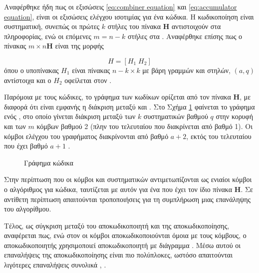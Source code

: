 Αναφέρθηκε ήδη πως οι εξισώσεις \ref{eq:combiner equation} και \ref{eq:accumulator equation}, είναι οι εξισώσεις ελέγχου ισοτιμίας για ένα  κώδικα. Η κωδικοποίηση είναι συστηματική, συνεπώς οι πρώτες $k$ στήλες του πίνακα $\mathbf{H}$ αντιστοιχούν στα  πληροφορίας, ενώ οι επόμενες $m=n-k$ στήλες στα . Αναφέρθηκε επίσης πως ο πίνακας $m\times n \mathbf{H}$ είναι της μορφής

\begin{equation}
H=[H_1\;H_2]
\label{eq:RA parity check matrix form}
\end{equation}
όπου ο υποπίνακας $H_1$ είναι πίνακας $n-k\times k$ με βάρη γραμμών και στηλών, $(a,q)$ αντίστοιχα και ο $H_2$ οφείλεται στον .

Παρόμοια με τους  κώδικες, το γράφημα  των  κωδίκων ορίζεται από τον πίνακα $\mathbf{H}$, με διαφορά ότι είναι εμφανής η διάκριση μεταξύ  και . Στο Σχήμα \ref{fig:RA tanner graph} φαίνεται το γράφημα  ενός , στο οποίο γίνεται διάκριση μεταξύ των $k$ συστηματικών  βαθμού $q$ στην κορυφή και των $m$  κόμβων βαθμού 2 (πλην του τελευταίου που διακρίνεται από βαθμό 1). Οι κόμβοι ελέγχου του γραφήματος διακρίνονται από βαθμό $a+2$, εκτός του τελευταίου που έχει βαθμό $a+1$ \cite{johnson2009iterative}.

\begin{figure}[H]
\caption{Γράφημα  κώδικα}
\label{fig:RA tanner graph}
\end{figure}

Στην περίπτωση που οι κόμβοι  και συστηματικών  αντιμετωπίζονται ως ενιαίοι κόμβοι  ο αλγόριθμος  για  κώδικα, ταυτίζεται με αυτόν για ένα  που έχει τον ίδιο πίνακα $\mathbf{H}$. Σε αντίθετη περίπτωση απαιτούνται τροποποιήσεις για τη συμπλήρωση μιας επανάληψης του αλγορίθμου.

Τέλος, ως σύγκριση μεταξύ του  αποκωδικοποιητή και της  αποκωδικοποίησης, αναφέρεται πως, ενώ στον  οι  κόμβοι αποκωδικοποιούνται όμοια με τους  κόμβους, ο  αποκωδικοποιητής χρησιμοποιεί  αποκωδικοποιητή με διάγραμμα . Μέσω αυτού οι επαναλήψεις της  αποκωδικοποίησης είναι πιο πολύπλοκες, ωστόσο απαιτούνται λιγότερες επαναλήψεις συνολικά \cite{ryan2009channel}, \cite{johnson2009iterative}.